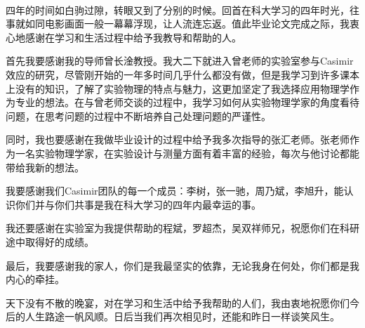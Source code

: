 
\begin{acknowledgements}
\paragraph*{}
四年的时间如白驹过隙，转眼又到了分别的时候。回首在科大学习的四年时光，往事就如同电影画面一般一幕幕浮现，让人流连忘返。值此毕业论文完成之际，我衷心地感谢在学习和生活过程中给予我教导和帮助的人。


首先我要感谢我的导师曾长淦教授。我大二下就进入曾老师的实验室参与Casimir效应的研究，尽管刚开始的一年多时间几乎什么都没有做，但是我学习到许多课本上没有的知识，了解了实验物理的特点与魅力，这更加坚定了我选择应用物理学作为专业的想法。在与曾老师交谈的过程中，我学习如何从实验物理学家的角度看待问题，在思考问题的过程中不断培养自己处理问题的严谨性。


同时，我也要感谢在我做毕业设计的过程中给予我多次指导的张汇老师。张老师作为一名实验物理学家，在实验设计与测量方面有着丰富的经验，每次与他讨论都能带给我新的想法。


我要感谢我们Casimir团队的每一个成员：李树，张一驰，周乃斌，李旭升，能认识你们并与你们共事是我在科大学习的四年内最幸运的事。


我还要感谢在实验室为我提供帮助的程斌，罗超杰，吴双祥师兄，祝愿你们在科研途中取得好的成绩。


最后，我要感谢我的家人，你们是我最坚实的依靠，无论我身在何处，你们都是我内心的牵挂。


天下没有不散的晚宴，对在学习和生活中给予我帮助的人们，我由衷地祝愿你们今后的人生路途一帆风顺。日后当我们再次相见时，还能和昨日一样谈笑风生。

\end{acknowledgements}
